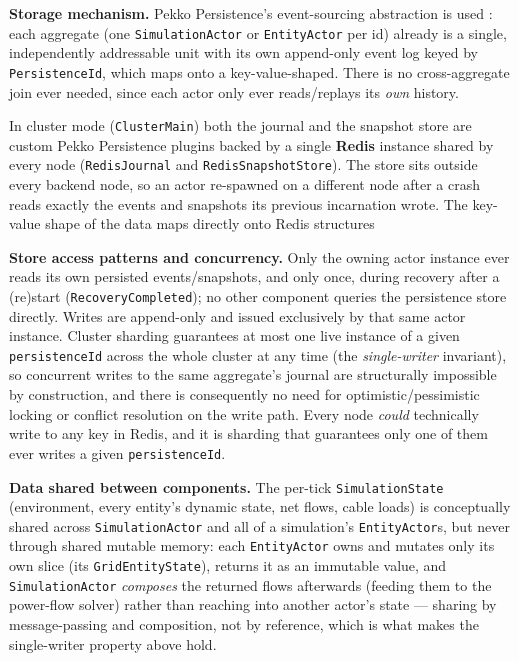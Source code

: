 \documentclass{scrreprt}
\begin{document}
\textbf{Storage mechanism.} Pekko Persistence's event-sourcing abstraction is used
: each aggregate (one \texttt{SimulationActor} or
\texttt{EntityActor} per id) already is a single, independently addressable unit with its own
append-only event log keyed by \texttt{PersistenceId}, which maps onto a
key-value-shaped.
There is no cross-aggregate join ever needed, since each actor only ever reads/replays its
\emph{own} history.

In cluster mode (\texttt{ClusterMain}) both the journal and the snapshot store are custom Pekko
Persistence plugins backed by a single \textbf{Redis} instance shared by every node
(\texttt{RedisJournal} and \texttt{RedisSnapshotStore}). The
store sits outside every backend node, so an actor re-spawned on a different node after a crash
reads exactly the events and snapshots its previous incarnation wrote. The key-value shape of
the data maps directly onto Redis structures

\textbf{Store access patterns and concurrency.} Only the owning actor instance ever
reads its own persisted events/snapshots, and only once, during recovery after a (re)start
(\texttt{RecoveryCompleted}); no other component queries the persistence store directly. Writes
are append-only and issued exclusively by that same actor instance. Cluster sharding guarantees
at most one live instance of a given \texttt{persistenceId} across the whole cluster at any
time (the \emph{single-writer} invariant), so concurrent writes to the same aggregate's journal
are structurally impossible by construction, and there is consequently no need for
optimistic/pessimistic locking or conflict resolution on the write path. Every node \emph{could} technically write to any key in
Redis, and it is sharding that guarantees only one of them ever writes a given \texttt{persistenceId}.

\textbf{Data shared between components.} The per-tick \texttt{SimulationState} (environment,
every entity's dynamic state, net flows, cable loads) is conceptually shared across
\texttt{SimulationActor} and all of a simulation's \texttt{EntityActor}s, but never through
shared mutable memory: each \texttt{EntityActor} owns and mutates only its own slice (its
\texttt{GridEntityState}), returns it as an immutable value, and \texttt{SimulationActor}
\emph{composes} the returned flows afterwards (feeding them to the power-flow solver) rather
than reaching into another actor's state --- sharing by message-passing and composition, not by
reference, which is what makes the single-writer property above hold.
\end{document}
